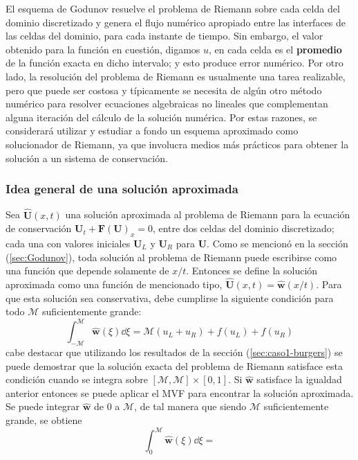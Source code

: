 El esquema de Godunov resuelve el problema de Riemann sobre cada celda del dominio discretizado y genera el flujo numérico apropiado entre las interfaces de las celdas del dominio, para cada instante de tiempo. Sin embargo, el valor obtenido para la función en cuestión, digamos $u$, en cada celda es el \textbf{promedio} de la función exacta en dicho intervalo; y esto produce error numérico. Por otro lado, la resolución del problema de Riemann es usualmente una tarea realizable, pero que puede ser costosa y típicamente se necesita de algún otro método numérico para resolver ecuaciones algebraicas no lineales que complementan alguna iteración del cálculo de la solución numérica. Por estas razones, se considerará utilizar y estudiar a fondo un esquema aproximado como solucionador de Riemann, ya que involucra medios más prácticos para obtener la solución a un sistema de conservación.

\subsubsection{Idea general de una solución aproximada}
Sea $\mathbf{\hat{U}}(x,t)$ una solución aproximada al problema de Riemann para la ecuación de conservación $\mathbf{U}_t + \mathbf{F}(\mathbf{U})_x = 0$, entre dos celdas del dominio discretizado; cada una con valores iniciales $\mathbf{U}_L$ y $\mathbf{U}_R$ para $\mathbf{U}$. Como se mencionó en la sección (\ref{sec:Godunov}), toda solución al problema de Riemann puede escribirse como una función que depende solamente de $x/t$. Entonces se define la solución aproximada como una función de mencionado tipo, $\mathbf{\hat{U}}(x,t) = \mathbf{\hat{w}}(x/t)$. Para que esta solución sea conservativa, debe cumplirse la siguiente condición para todo $\mathcal{M}$ suficientemente grande:
\begin{equation}
	\int_{-\mathcal{M}}^{\mathcal{M}} \mathbf{\hat{w}}(\xi) \dd{\xi} = \mathcal{M} (u_L + u_R) + f(u_L) + f(u_R)
\end{equation}
cabe destacar que utilizando los resultados de la sección (\ref{sec:caso1-burgers}) se puede demostrar que la solución exacta del problema de Riemann satisface esta condición cuando se integra sobre $[\mathcal{M},\mathcal{M}]\times[0,1]$. Si $\mathbf{\hat{w}}$ satisface la igualdad anterior entonces se puede aplicar el MVF para encontrar la solución aproximada. Se puede integrar $\mathbf{\hat{w}}$ de $0$ a $\mathcal{M}$, de tal manera que siendo $\mathcal{M}$ suficientemente grande, se obtiene
\begin{equation}
	\int_{0}^{\mathcal{M}} \mathbf{\hat{w}}(\xi) \dd{\xi} =
\end{equation}